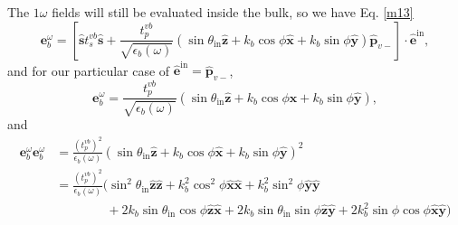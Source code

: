 The $1\omega$ fields will still be evaluated inside the bulk, so we have Eq.
\eqref{m13}
\begin{equation*}
\mathbf{e}^{\omega}_{b}
= \left[
\hat{\mathbf{s}}t_{s}^{vb}\hat{\mathbf{s}}
+ \frac{t^{vb}_{p}}{\sqrt{\epsilon_{b}(\omega)}}
\left(
  \sin\theta_{\mathrm{in}}\hat{\mathbf{z}}
+ k_{b}\cos\phi\hat{\mathbf{x}}
+ k_{b}\sin\phi\hat{\mathbf{y}}
\right) 
\hat{\mathbf{p}}_{v-}
\right]
\cdot\hat{\mathbf{e}}^{\mathrm{in}},  
\end{equation*}
and for our particular case of
$\hat{\mathbf{e}}^{\mathrm{in}}=\hat{\mathbf{p}}_{v-}$,
\begin{equation*}
\mathbf{e}^{\omega}_{b}
= \frac{t^{vb}_{p}}{\sqrt{\epsilon_{b}(\omega)}}
\left(
  \sin\theta_{\mathrm{in}}\hat{\mathbf{z}}
+ k_{b}\cos\phi\hat{\mathbf{x}}
+ k_{b}\sin\phi\hat{\mathbf{y}}
\right),
\end{equation*}
and
\begin{equation*}
\begin{split}
\mathbf{e}^{\omega}_{b}\mathbf{e}^{\omega}_{b}
&= \frac{\left(t^{vb}_{p}\right)^{2}}{\epsilon_{b}(\omega)}
\left(
  \sin\theta_{\mathrm{in}}\hat{\mathbf{z}}
+ k_{b}\cos\phi\hat{\mathbf{x}}
+ k_{b}\sin\phi\hat{\mathbf{y}}
\right)^{2}\\
&= \frac{\left(t^{vb}_{p}\right)^{2}}{\epsilon_{b}(\omega)}
\big(
  \sin^{2}\theta_{\mathrm{in}}\hat{\mathbf{z}}\hat{\mathbf{z}}
+ k^{2}_{b}\cos^{2}\phi\hat{\mathbf{x}}\hat{\mathbf{x}}
+ k^{2}_{b}\sin^{2}\phi\hat{\mathbf{y}}\hat{\mathbf{y}}\\
&\qquad\qquad
+ 2k_{b}\sin\theta_{\mathrm{in}}\cos\phi\hat{\mathbf{z}}\hat{\mathbf{x}}
+ 2k_{b}\sin\theta_{\mathrm{in}}\sin\phi\hat{\mathbf{z}}\hat{\mathbf{y}}
+ 2k^{2}_{b}\sin\phi\cos\phi\hat{\mathbf{x}}\hat{\mathbf{y}}
\big)
\end{split}
\end{equation*}

